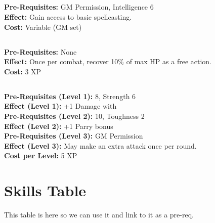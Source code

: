 \documentclass[12pt]{article}
\begin{document}
\begin{multicols}{2}
\medskip

\subsection*{}
\textbf{Pre-Requisites:} GM Permission, Intelligence 6\\
\textbf{Effect:} Gain access to basic spellcasting.\\
\textbf{Cost:} Variable (GM set)

\medskip

\subsection*{}
\textbf{Pre-Requisites:} None\\
\textbf{Effect:} Once per combat, recover 10\% of max HP as a free action.\\
\textbf{Cost:} 3 XP

\medskip

\subsection*{}
\textbf{Pre-Requisites (Level 1):}  8, Strength 6\\
\textbf{Effect (Level 1):} +1 Damage with \\[0.25em]
\textbf{Pre-Requisites (Level 2):}  10, Toughness 2\\
\textbf{Effect (Level 2):} +1 Parry bonus\\[0.25em]
\textbf{Pre-Requisites (Level 3):} GM Permission\\
\textbf{Effect (Level 3):} May make an extra attack once per round.\\
\textbf{Cost per Level:} 5 XP

\end{multicols}
\newpage

\section{Skills Table}

This table is here so we can use it and link to it as a pre-req.
\end{document}
